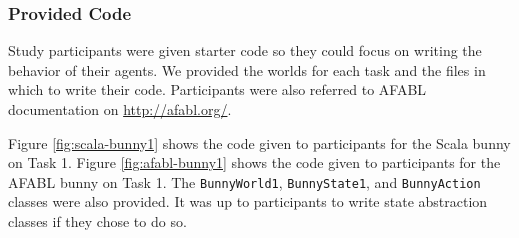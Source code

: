 






\subsubsection{Provided Code}

Study participants were given starter code so they could focus on writing the behavior of their agents. We provided the worlds for each task and the files in which to write their code. Participants were also referred to AFABL documentation on \href{http://afabl.org/}{http://afabl.org/}.

Figure \ref{fig:scala-bunny1} shows the code given to participants for the Scala bunny on Task 1. Figure \ref{fig:afabl-bunny1} shows the code given to participants for the AFABL bunny on Task 1. The {\tt BunnyWorld1}, {\tt BunnyState1}, and {\tt BunnyAction} classes were also provided. It was up to participants to write state abstraction classes if they chose to do so.


